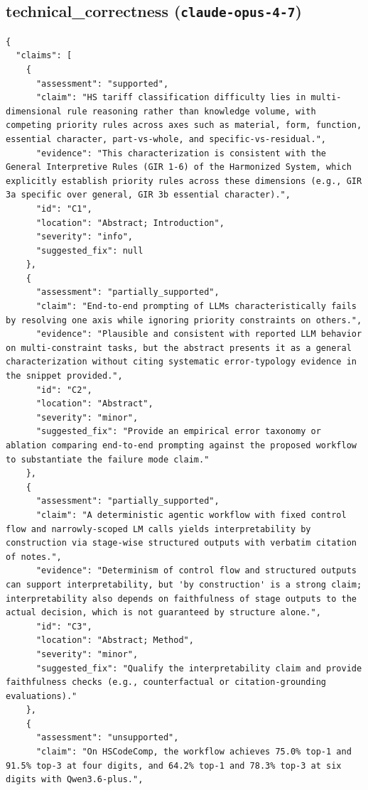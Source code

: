 \documentclass[11pt]{article}
\begin{document}
\subsection*{technical_correctness (\texttt{claude-opus-4-7})}
\begin{verbatim}
{
  "claims": [
    {
      "assessment": "supported",
      "claim": "HS tariff classification difficulty lies in multi-dimensional rule reasoning rather than knowledge volume, with competing priority rules across axes such as material, form, function, essential character, part-vs-whole, and specific-vs-residual.",
      "evidence": "This characterization is consistent with the General Interpretive Rules (GIR 1-6) of the Harmonized System, which explicitly establish priority rules across these dimensions (e.g., GIR 3a specific over general, GIR 3b essential character).",
      "id": "C1",
      "location": "Abstract; Introduction",
      "severity": "info",
      "suggested_fix": null
    },
    {
      "assessment": "partially_supported",
      "claim": "End-to-end prompting of LLMs characteristically fails by resolving one axis while ignoring priority constraints on others.",
      "evidence": "Plausible and consistent with reported LLM behavior on multi-constraint tasks, but the abstract presents it as a general characterization without citing systematic error-typology evidence in the snippet provided.",
      "id": "C2",
      "location": "Abstract",
      "severity": "minor",
      "suggested_fix": "Provide an empirical error taxonomy or ablation comparing end-to-end prompting against the proposed workflow to substantiate the failure mode claim."
    },
    {
      "assessment": "partially_supported",
      "claim": "A deterministic agentic workflow with fixed control flow and narrowly-scoped LM calls yields interpretability by construction via stage-wise structured outputs with verbatim citation of notes.",
      "evidence": "Determinism of control flow and structured outputs can support interpretability, but 'by construction' is a strong claim; interpretability also depends on faithfulness of stage outputs to the actual decision, which is not guaranteed by structure alone.",
      "id": "C3",
      "location": "Abstract; Method",
      "severity": "minor",
      "suggested_fix": "Qualify the interpretability claim and provide faithfulness checks (e.g., counterfactual or citation-grounding evaluations)."
    },
    {
      "assessment": "unsupported",
      "claim": "On HSCodeComp, the workflow achieves 75.0% top-1 and 91.5% top-3 at four digits, and 64.2% top-1 and 78.3% top-3 at six digits with Qwen3.6-plus.",

\end{verbatim}
\end{document}
